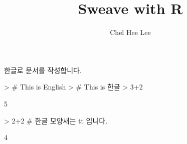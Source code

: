 \documentclass{article}
\title{Sweave with R}
\author{Chel Hee Lee}
\renewenvironment{Schunk}{\vspace{\topsep}}{\vspace{\topsep}}
\begin{document}
\maketitle

한글로 문서를 작성합니다. 
\begin{Schunk}
\begin{Sinput}
> # This is English
> # This is 한글 
> 3+2
\end{Sinput}
\begin{Soutput}
[1] 5
\end{Soutput}
\end{Schunk}

\begin{Schunk}
\begin{Sinput}
> 2+2 # 한글 모양새는 tt 입니다. 
\end{Sinput}
\begin{Soutput}
[1] 4
\end{Soutput}
\end{Schunk}
\end{document}
